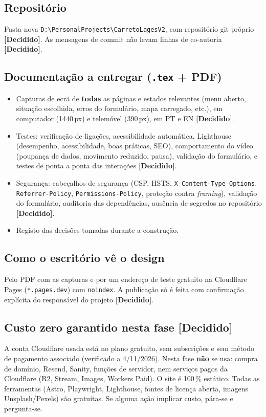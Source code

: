 \documentclass[11pt,a4paper]{article}
\newcommand{\decidido}{\textcolor{verde700}{\textbf{[Decidido]}}}
\begin{document}
\subsection*{Repositório}
Pasta nova \texttt{D:\textbackslash PersonalProjects\textbackslash CarretoLagesV2}, com repositório git próprio \decidido. As mensagens de commit não levam linhas de co-autoria \decidido.

\subsection*{Documentação a entregar (\texttt{.tex} + PDF)}
\begin{itemize}
  \item Capturas de ecrã de \textbf{todas} as páginas e estados relevantes (menu aberto, situação escolhida, erros do formulário, mapa carregado, etc.), em computador (1440\,px) e telemóvel (390\,px), em PT e EN \decidido.
  \item Testes: verificação de ligações, acessibilidade automática, Lighthouse (desempenho, acessibilidade, boas práticas, SEO), comportamento do vídeo (poupança de dados, movimento reduzido, pausa), validação do formulário, e testes de ponta a ponta das interações \decidido.
  \item Segurança: cabeçalhos de segurança (CSP, HSTS, \texttt{X-Content-Type-Options}, \texttt{Referrer-Policy}, \texttt{Permissions-Policy}, proteção contra \textit{framing}), validação do formulário, auditoria das dependências, ausência de segredos no repositório \decidido.
  \item Registo das decisões tomadas durante a construção.
\end{itemize}

\subsection*{Como o escritório vê o design}
Pelo PDF com as capturas e por um endereço de teste gratuito na Cloudflare Pages (\texttt{*.pages.dev}) com \texttt{noindex}. A publicação só é feita com confirmação explícita do responsável do projeto \decidido.

\subsection*{Custo zero garantido nesta fase \decidido}
A conta Cloudflare usada está no plano gratuito, sem subscrições e sem método de pagamento associado (verificado a 4/11/2026). Nesta fase \textbf{não} se usa: compra de domínio, Resend, Sanity, funções de servidor, nem serviços pagos da Cloudflare (R2, Stream, Images, Workers Paid). O site é 100\,\% estático. Todas as ferramentas (Astro, Playwright, Lighthouse, fontes de licença aberta, imagens Unsplash/Pexels) são gratuitas. Se alguma ação implicar custo, pára-se e pergunta-se.
\end{document}
